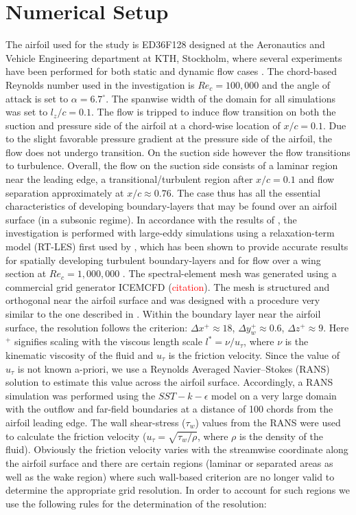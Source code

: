 \section{Numerical Setup}
The airfoil used for the study is ED36F128 designed at the Aeronautics and Vehicle Engineering department at KTH, Stockholm, where several experiments have been performed for both static \citep{lokatt17} and dynamic flow cases \citep{lokattthesis}. The chord-based Reynolds number used in the investigation is $Re_{c}=100,000$ and the angle of attack is set to $\alpha=6.7^{\circ}$. The spanwise width of the domain for all simulations was set to $l_{z}/c=0.1$. The flow is tripped to induce flow transition on both the suction and pressure side of the airfoil at a chord-wise location of $x/c=0.1$. Due to the slight favorable pressure gradient at the pressure side of the airfoil, the flow does not undergo transition. On the suction side however the flow transitions to turbulence. Overall, the flow on the suction side consists of a laminar region near the leading edge, a transitional/turbulent region after $x/c=0.1$ and flow separation approximately at $x/c\approx0.76$. The case thus has all the essential characteristics of developing boundary-layers that may be found over an airfoil surface (in a subsonic regime). In accordance with the results of \cite{proc-tsfp10-negi}, the investigation is performed with large-eddy simulations using a relaxation-term model (RT-LES) first used by \cite{schlatter04}, which has been shown to provide accurate results for spatially developing turbulent boundary-layers \citep{eitel14} and for flow over a wing section at $Re_{c}=1,000,000$ \citep{proc-tsfp10-vinuesa}. The spectral-element mesh was generated using a commercial grid generator ICEMCFD (\textcolor{red}{citation}). The mesh is structured and orthogonal near the airfoil surface and was designed with a procedure very similar to the one described in \cite{hosseini16}. Within the boundary layer near the airfoil surface, the resolution follows the criterion: $\Delta x^{+}\approx18$, $\Delta y_{w}^{+}\approx0.6$, $\Delta z^{+}\approx 9$. Here $^{+}$ signifies scaling with the viscous length scale $l^{*}=\nu/u_{\tau}$, where $\nu$ is the kinematic viscosity of the fluid and $u_{\tau}$ is the friction velocity. Since the value of $u_{\tau}$ is not known a-priori, we use a Reynolds Averaged Navier--Stokes (RANS) solution to estimate this value across the airfoil surface. Accordingly, a RANS simulation was performed using the $SST-k-\epsilon$ model on a very large domain with the outflow and far-field boundaries at a distance of 100 chords from the airfoil leading edge. The wall shear-stress ($\tau_{w}$) values from the RANS were used to calculate the friction velocity ($u_{\tau}=\sqrt{\tau_{w}/\rho}$, where $\rho$ is the density of the fluid). Obviously the friction velocity varies with the streamwise coordinate along the airfoil surface and there are certain regions (laminar or separated areas as well as the wake region) where such wall-based criterion are no longer valid to determine the appropriate grid resolution. In order to account for such regions we use the following rules for the determination of the resolution:
